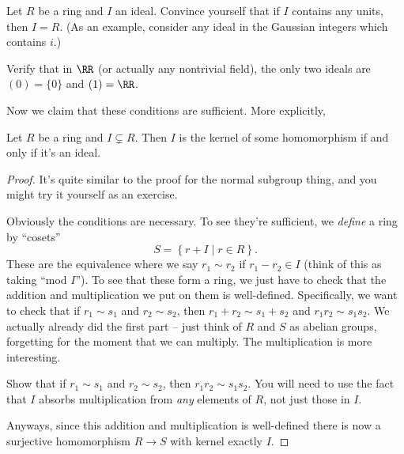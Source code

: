 \begin{ques}
	Let $R$ be a ring and $I$ an ideal.
	Convince yourself that if $I$ contains any units, then $I = R$.
	(As an example, consider any ideal in the Gaussian integers
	which contains $i$.)
\end{ques}
\begin{ques}
	Verify that in $\RR$ (or actually any nontrivial field),
	the only two ideals are $(0) = \{0\}$ and $(1) = \RR$.
\end{ques}

Now we claim that these conditions are sufficient.
More explicitly,
\begin{theorem}
	Let $R$ be a ring and $I \subsetneq R$.
	Then $I$ is the kernel of some homomorphism if and only if it's an ideal.
\end{theorem}
\begin{proof}
	It's quite similar to the proof for the normal subgroup thing,
	and you might try it yourself as an exercise.
	
	Obviously the conditions are necessary.
	To see they're sufficient, we \emph{define} a ring by ``cosets''
	\[ S = \left\{ r + I \mid r \in R \right\}. \]
	These are the equivalence where we say $r_1 \sim r_2$ if $r_1 - r_2 \in I$
	(think of this as taking ``mod $I$'').
	To see that these form a ring, we just have to check that the addition
	and multiplication we put on them is well-defined.
	Specifically, we want to check that if $r_1 \sim s_1$ and $r_2 \sim s_2$,
	then $r_1 + r_2 \sim s_1 + s_2$ and $r_1r_2 \sim s_1s_2$.
	We actually already did the first part -- just think of $R$ and $S$ as abelian
	groups, forgetting for the moment that we can multiply.
	The multiplication is more interesting.
	\begin{exercise}
		[Recommended]
		Show that if $r_1 \sim s_1$ and $r_2 \sim s_2$, then $r_1r_2 \sim s_1s_2$.
		You will need to use the fact that $I$ absorbs multiplication
		from \emph{any} elements of $R$, not just those in $I$.
	\end{exercise}
	Anyways, since this addition and multiplication is well-defined there
	is now a surjective homomorphism $R \to S$ with kernel exactly $I$.
\end{proof}

